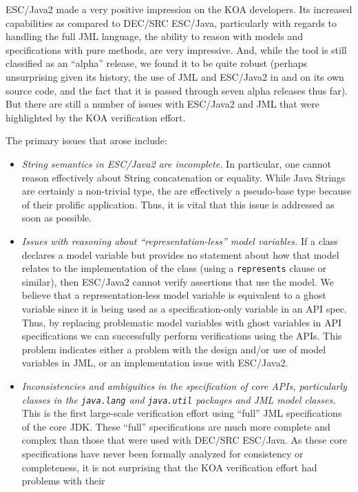 \documentclass{llncs}
\begin{document}
ESC/Java2 made a very positive impression on the KOA developers.  Its
increased capabilities as compared to DEC/SRC ESC/Java, particularly
with regards to handling the full JML language, the ability to reason
with models and specifications with pure methods, are very impressive.
And, while the tool is still classified as an ``alpha'' release, we
found it to be quite robust (perhaps unsurprising given its history,
the use of JML and ESC/Java2 in and on its own source code, and the
fact that it is passed through seven alpha releases thus far).  But
there are still a number of issues with ESC/Java2 and JML that were
highlighted by the KOA verification effort.

The primary issues that arose include:
\begin{itemize}
\item \emph{String semantics in ESC/Java2 are incomplete.}  In
  particular, one cannot reason effectively about String concatenation
  or equality.  While Java Strings are certainly a non-trivial type,
  the are effectively a pseudo-base type because of their prolific
  application.  Thus, it is vital that this issue is addressed as soon
  as possible.
\item \emph{Issues with reasoning about ``representation-less'' model
    variables.}  If a class declares a model variable but provides no
  statement about how that model relates to the implementation of the
  class (using a \texttt{represents} clause or similar), then
  ESC/Java2 cannot verify assertions that use the model.  We believe
  that a representation-less model variable is equivalent to a ghost
  variable since it is being used as a specification-only variable in
  an API spec.  Thus, by replacing problematic model variables with
  ghost variables in API specifications we can successfully perform
  verifications using the APIs.  This problem indicates either a
  problem with the design and/or use of model variables in JML, or an
  implementation issue with ESC/Java2.
\item \emph{Inconsistencies and ambiguities in the specification of
    core APIs, particularly classes in the \texttt{java.lang} and
    \texttt{java.util} packages and JML model classes.}  This is the
  first large-scale verification effort using ``full'' JML
  specifications of the core JDK.  These ``full'' specifications are
  much more complete and complex than those that were used with
  DEC/SRC ESC/Java.  As these core specifications have never been
  formally analyzed for consistency or completeness, it is not
  surprising that the KOA verification effort had problems with their

\end{itemize}
\end{document}
